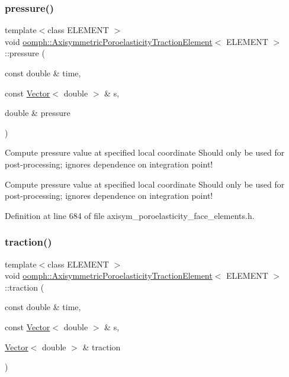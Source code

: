 \subsubsection{\texorpdfstring{pressure()}{pressure()}}
{\footnotesize\ttfamily template$<$class E\+L\+E\+M\+E\+NT $>$ \\
void \hyperlink{classoomph_1_1AxisymmetricPoroelasticityTractionElement}{oomph\+::\+Axisymmetric\+Poroelasticity\+Traction\+Element}$<$ E\+L\+E\+M\+E\+NT $>$\+::pressure (\begin{DoxyParamCaption}\item[{const double \&}]{time,  }\item[{const \hyperlink{classoomph_1_1Vector}{Vector}$<$ double $>$ \&}]{s,  }\item[{double \&}]{pressure }\end{DoxyParamCaption})}



Compute pressure value at specified local coordinate Should only be used for post-\/processing; ignores dependence on integration point! 

Compute pressure value at specified local coordinate Should only be used for post-\/processing; ignores dependence on integration point! 

Definition at line 684 of file axisym\+\_\+poroelasticity\+\_\+face\+\_\+elements.\+h.

\mbox{\label{classoomph_1_1AxisymmetricPoroelasticityTractionElement_abb8e937540df8384b6129793497f1e50}} 
\subsubsection{\texorpdfstring{traction()}{traction()}}
{\footnotesize\ttfamily template$<$class E\+L\+E\+M\+E\+NT $>$ \\
void \hyperlink{classoomph_1_1AxisymmetricPoroelasticityTractionElement}{oomph\+::\+Axisymmetric\+Poroelasticity\+Traction\+Element}$<$ E\+L\+E\+M\+E\+NT $>$\+::traction (\begin{DoxyParamCaption}\item[{const double \&}]{time,  }\item[{const \hyperlink{classoomph_1_1Vector}{Vector}$<$ double $>$ \&}]{s,  }\item[{\hyperlink{classoomph_1_1Vector}{Vector}$<$ double $>$ \&}]{traction }\end{DoxyParamCaption})}



